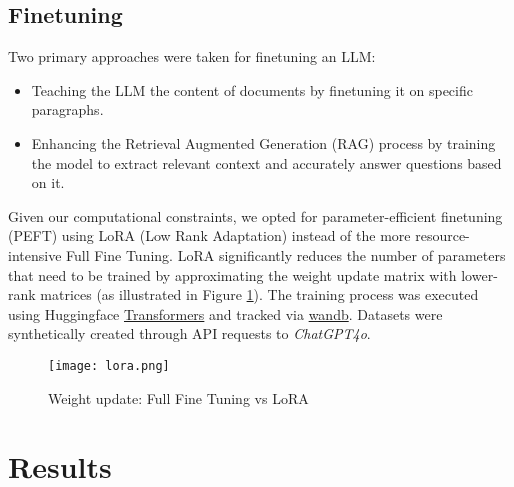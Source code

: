 \documentclass[conference]{IEEEtran}
\begin{document}
\subsection{Finetuning}
Two primary approaches were taken for finetuning an LLM:

\begin{itemize}
\item Teaching the LLM the content of documents by finetuning it on specific paragraphs.
\item Enhancing the Retrieval Augmented Generation (RAG) process by training the model to extract relevant context and accurately answer questions based on it.
\end{itemize}

Given our computational constraints, we opted for parameter-efficient finetuning (PEFT) using LoRA (Low Rank Adaptation) instead of the more resource-intensive Full Fine Tuning. LoRA significantly reduces the number of parameters that need to be trained by approximating the weight update matrix with lower-rank matrices (as illustrated in Figure \ref{fig:LORA}). The training process was executed using Huggingface \href{https://huggingface.co/docs/transformers/de/index}{Transformers} and tracked via \href{https://wandb.ai/site}{wandb}. Datasets were synthetically created through API requests to \textit{ChatGPT4o}.
\newline
\newline




\begin{figure}[]
    \centering
    \texttt{[image: lora.png]}
    \caption{Weight update: Full Fine Tuning vs LoRA}
    \label{fig:LORA}
\end{figure}




\section{Results}
\end{document}
